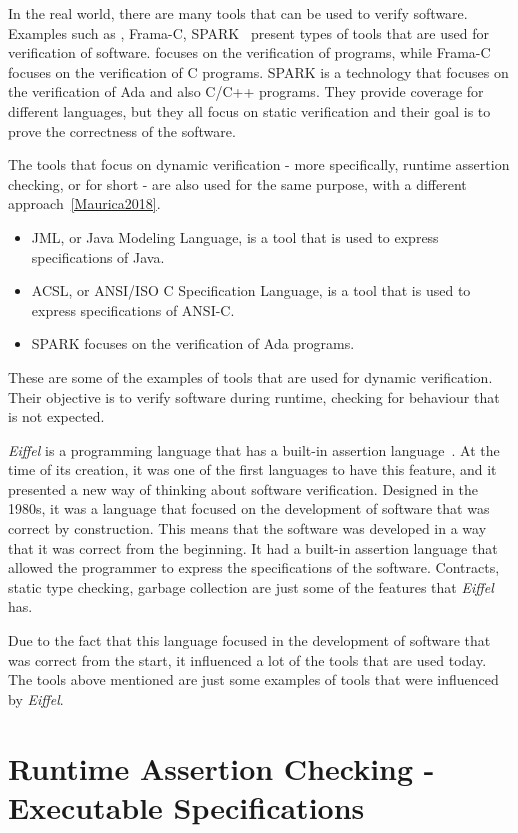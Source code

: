 In the real world, there are many tools that can be used to verify software. 
Examples such as \why, Frama-C, SPARK~\cite{Kosmatov2014} present types of tools that are used 
for verification of software. \why focuses on the verification of \ocaml programs, while Frama-C 
focuses on the verification of C programs. SPARK is a technology that focuses on the verification 
of Ada and also C/C++ programs. They provide coverage for different languages, but they all 
focus on static verification and their goal is to prove the correctness of the software.

The tools that focus on dynamic verification - more specifically, runtime assertion checking, 
or \rac for short - are also used for the same purpose, with a different approach~\ref{Maurica2018}. 
\begin{itemize}
  \item JML, or Java Modeling Language, is a tool that is used to express specifications of Java.
  \item ACSL, or ANSI/ISO C Specification Language, is a tool that is used to express specifications of ANSI-C.
  \item SPARK focuses on the verification of Ada programs.
\end{itemize}
These are some of the examples of tools that are used for dynamic verification. Their objective 
is to verify software during runtime, checking for behaviour that is not expected.

\textit{Eiffel} is a programming language that has a built-in assertion language~\cite{Maurica2018}. 
At the time of its creation, it was one of the first languages to have this feature, and it presented 
a new way of thinking about software verification. Designed in the 1980s, it was a language that 
focused on the development of software that was correct by construction. This means that the 
software was developed in a way that it was correct from the beginning. It had a built-in assertion 
language that allowed the programmer to express the specifications of the software. Contracts, 
static type checking, garbage collection are just some of the features that \textit{Eiffel} has. 

Due to the fact that this language focused in the development of software that was correct from the 
start, it influenced a lot of the tools that are used today. The tools above mentioned are 
just some examples of tools that were influenced by \textit{Eiffel}.

\section{Runtime Assertion Checking - Executable Specifications}

